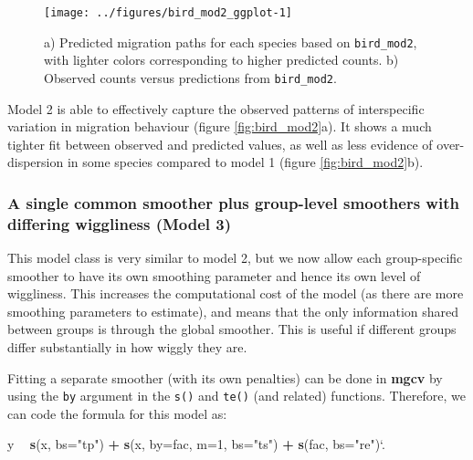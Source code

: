 \documentclass[12pt]{article}
\newenvironment{Shaded}{\begin{snugshade}}{\end{snugshade}}
\newcommand{\KeywordTok}[1]{\textcolor[rgb]{0.13,0.29,0.53}{\textbf{#1}}}
\newcommand{\DataTypeTok}[1]{\textcolor[rgb]{0.13,0.29,0.53}{#1}}
\newcommand{\DecValTok}[1]{\textcolor[rgb]{0.00,0.00,0.81}{#1}}
\newcommand{\StringTok}[1]{\textcolor[rgb]{0.31,0.60,0.02}{#1}}
\newcommand{\OperatorTok}[1]{\textcolor[rgb]{0.81,0.36,0.00}{\textbf{#1}}}
\newcommand{\NormalTok}[1]{#1}
\begin{document}
\begin{figure}
\texttt{[image: ../figures/bird\_mod2\_ggplot-1]} \caption{\label{fig:bird_mod2}a) Predicted migration paths for each species based on \texttt{bird\_mod2}, with lighter colors corresponding to higher predicted counts. b) Observed counts versus predictions from \texttt{bird\_mod2}.}\label{fig:bird_mod2_ggplot}
\end{figure}

Model 2 is able to effectively capture the observed patterns of
interspecific variation in migration behaviour (figure
\ref{fig:bird_mod2}a). It shows a much tighter fit between observed and
predicted values, as well as less evidence of over-dispersion in some
species compared to model 1 (figure \ref{fig:bird_mod2}b).

\subsubsection{A single common smoother plus group-level smoothers with
differing wiggliness (Model
3)}\label{a-single-common-smoother-plus-group-level-smoothers-with-differing-wiggliness-model-3}

This model class is very similar to model 2, but we now allow each
group-specific smoother to have its own smoothing parameter and hence
its own level of wiggliness. This increases the computational cost of
the model (as there are more smoothing parameters to estimate), and
means that the only information shared between groups is through the
global smoother. This is useful if different groups differ substantially
in how wiggly they are.

Fitting a separate smoother (with its own penalties) can be done in
\textbf{mgcv} by using the \texttt{by} argument in the \texttt{s()} and
\texttt{te()} (and related) functions. Therefore, we can code the
formula for this model as:

\begin{Shaded}
\begin{Highlighting}[]
\NormalTok{y }\OperatorTok{~}\StringTok{ }\KeywordTok{s}\NormalTok{(x, }\DataTypeTok{bs=}\StringTok{"tp"}\NormalTok{) }\OperatorTok{+}\StringTok{ }\KeywordTok{s}\NormalTok{(x, }\DataTypeTok{by=}\NormalTok{fac, }\DataTypeTok{m=}\DecValTok{1}\NormalTok{, }\DataTypeTok{bs=}\StringTok{"ts"}\NormalTok{) }\OperatorTok{+}\StringTok{ }\KeywordTok{s}\NormalTok{(fac, }\DataTypeTok{bs=}\StringTok{"re"}\NormalTok{)}\StringTok{`}\DataTypeTok{.}
\end{Highlighting}
\end{Shaded}
\end{document}
